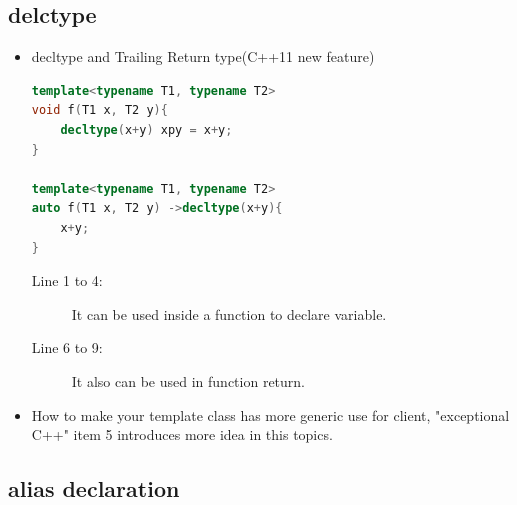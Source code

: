 \documentclass[a4paper,11pt,twoside]{book}
\begin{document}
\subsection{delctype}
\begin{itemize}

\item decltype and  Trailing Return type(C++11 new feature)
\begin{lstlisting}[frame=single, language=c++]
template<typename T1, typename T2>
void f(T1 x, T2 y){
	decltype(x+y) xpy = x+y;
}

template<typename T1, typename T2>
auto f(T1 x, T2 y) ->decltype(x+y){
	x+y;
}
\end{lstlisting}
\begin{description}
	\item[Line 1 to 4:] It can be used inside a function to declare variable.
	\item[Line 6 to 9:] It also can be used in function return.
\end{description}

\item How to make your template class has more generic use for client, "exceptional C++" item 5 introduces more idea in this topics.

\end{itemize}


\subsection{alias declaration}
\end{document}
